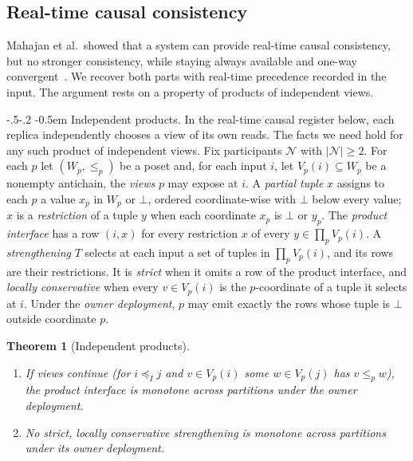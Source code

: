 \documentclass[sigconf]{cidr-2027}
\makeatletter
\newtheorem{theorem}{Theorem}
\theoremstyle{remark}
\renewcommand\paragraph{\@startsection{paragraph}{4}{\z@}%
  {-.5\baselineskip \@plus -2\p@ \@minus -.2\p@}%
  {-0.5em}%
  {\normalfont\bfseries}}
\newcommand{\InputOrd}{\preceq_I}
\makeatother
\begin{document}
\subsection{Real-time causal consistency}
\label{app:rtc}

Mahajan et al.\ showed that a system can provide real-time causal consistency,
but no stronger consistency, while staying always available and one-way
convergent~\cite{mahajan2011consistency}. We recover both parts with real-time
precedence recorded in the input. The argument rests on a property of
products of independent views.

\paragraph{Independent products.}
In the real-time causal register below, each replica independently chooses
a view of its own reads. The facts we need hold for any such product of
independent views. Fix participants
$\mathcal N$ with $|\mathcal N|\ge2$. For each $p$ let $(W_p,\le_p)$ be a poset
and, for each input $i$, let $V_p(i)\subseteq W_p$ be a nonempty antichain, the
\emph{views} $p$ may expose at $i$. A \emph{partial tuple} $x$ assigns to each
$p$ a value $x_p$ in $W_p$ or $\bot$, ordered coordinate-wise with $\bot$ below
every value; $x$ is a \emph{restriction} of a tuple $y$ when each coordinate
$x_p$ is $\bot$ or $y_p$. The \emph{product interface} has a row
$(i,x)$ for every restriction $x$ of every $y\in\prod_pV_p(i)$. A
\emph{strengthening} $T$ selects at each input a set of tuples in
$\prod_pV_p(i)$, and its rows are their restrictions. It is \emph{strict} when
it omits a row of the product interface, and \emph{locally conservative} when
every $v\in V_p(i)$ is the $p$-coordinate of a tuple it selects at $i$. Under
the \emph{owner deployment}, $p$ may emit exactly the rows whose tuple is
$\bot$ outside coordinate $p$.

\begin{theorem}[Independent products]
\label{thm:product-frontier}
\leavevmode
\begin{enumerate}
\item
If views continue (for $i\InputOrd j$ and $v\in V_p(i)$ some $w\in
        V_p(j)$ has $v\le_p w$), the product interface is monotone across
        partitions under the owner deployment.
\item
No strict, locally conservative strengthening is monotone across
        partitions under its owner deployment.
\end{enumerate}
\end{theorem}
\end{document}

